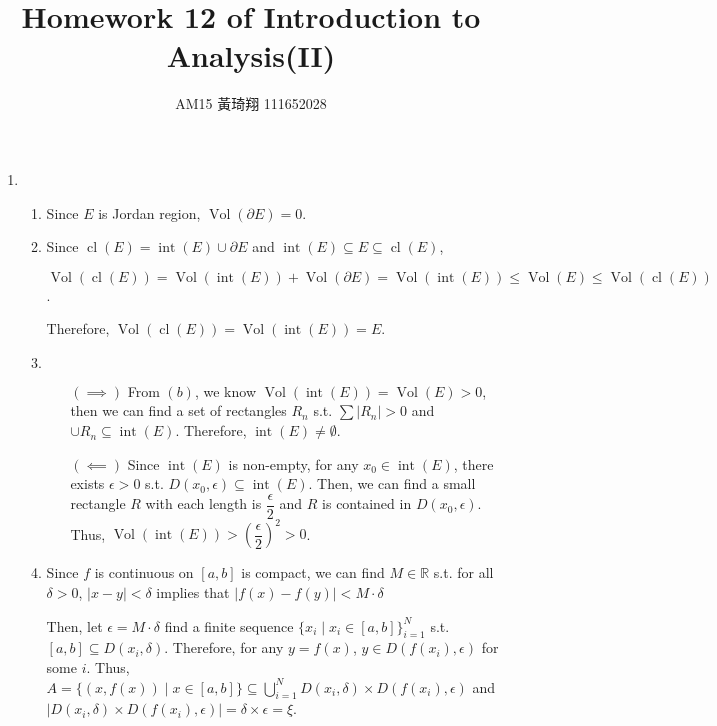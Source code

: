 \documentclass[12pt]{article}
\title{Homework 12 of Introduction to Analysis(II)}
\author{AM15 黃琦翔 111652028}
\DeclareMathOperator{\volumn}{Vol}
\DeclareMathOperator{\interior}{int}
\DeclareMathOperator{\closure}{cl}
\begin{document}
\maketitle
\begin{enumerate}
    \item \begin{enumerate}
        \item Since $E$ is Jordan region, $\volumn(\partial E) = 0$.

        \item Since $\closure(E) = \interior(E) \cup \partial E$ and $\interior(E)\subseteq E \subseteq \closure(E)$,

        $\volumn(\closure(E)) = \volumn(\interior(E)) + \volumn(\partial E) = \volumn(\interior(E))\leq \volumn(E) \leq \volumn(\closure(E))$.

        Therefore, $\volumn(\closure(E)) = \volumn(\interior(E)) = E$.

        \item $\ $
        \begin{enumerate}
            \item[$(\implies)$] From $(b)$, we know $\volumn(\interior(E)) = \volumn(E) > 0$, 
            then we can find a set of rectangles $R_n$ s.t. $\sum |R_n| > 0$ and $\cup R_n \subseteq \interior(E)$.
            Therefore, $\interior(E) \neq \emptyset$.

            \item[$(\impliedby)$] Since $\interior(E)$ is non-empty, for any $x_0\in \interior(E)$, there exists $\epsilon > 0$ s.t. $D(x_0, \epsilon) \subseteq \interior(E)$.
            Then, we can find a small rectangle $R$ with each length is $\dfrac{\epsilon}{2}$ and $R$ is contained in $D(x_0, \epsilon)$.
            Thus, $\volumn(\interior(E)) > \left(\dfrac{\epsilon}{2}\right)^2 > 0$.
        \end{enumerate}

        \item Since $f$ is continuous on $[a, b]$ is compact, we can find $M \in \mathbb{R}$ s.t.
        for all $\delta > 0$, $|x - y| < \delta$ implies that $|f(x) - f(y)| < M \cdot \delta$

        Then, let $\epsilon = M \cdot \delta$ find a finite sequence $\{x_i \mid x_i \in [a, b]\}_{i=1}^N$ s.t. $[a, b] \subseteq D(x_i, \delta)$.
        Therefore, for any $y = f(x)$, $y \in D(f(x_i), \epsilon)$ for some $i$.
        Thus, $A = \{(x, f(x)) \mid x\in [a, b]\} \subseteq \displaystyle\bigcup_{i=1}^N D(x_i, \delta)\times D(f(x_i), \epsilon)$ and $|D(x_i, \delta) \times D(f(x_i), \epsilon)| = \delta \times \epsilon = \xi$.
    \end{enumerate}
\end{enumerate}
\end{document}
